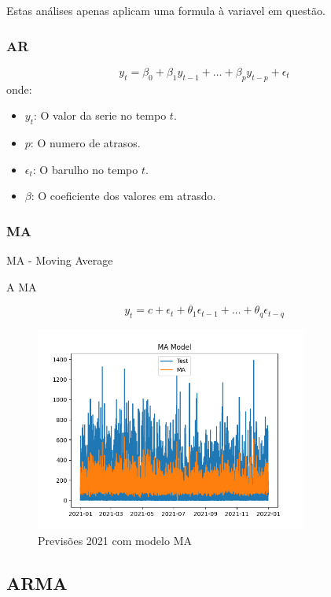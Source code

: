 Estas análises apenas aplicam uma formula à variavel em questão.

\subsubsection{AR}
\begin{equation} \label{eq:AR} 
    y_t = \beta_0 + \beta_1 y_{t-1} + \dots + \beta_p y_{t-p} + \epsilon_t 
\end{equation}
onde:
\begin{itemize}
  \item $y_t$: O valor da serie no tempo $t$.
  \item $p$: O numero de atrasos.
  \item $\epsilon_t$: O barulho no tempo $t$.
  \item $\beta$: O coeficiente dos valores em atrasdo.
\end{itemize}

\subsubsection{MA}
MA - Moving Average

A MA 


\begin{equation} \label{eq:MA} 
    y_t = c + \epsilon_t + \theta_1 \epsilon_{t-1} + \dots + \theta_q \epsilon_{t-q}
\end{equation}

\begin{figure}[H]
    \centering
    \includegraphics[width=0.8\textwidth]{../plots/MA_model.png}
    \caption{Previsões 2021 com modelo MA}
    \label{fig:MA_model}
\end{figure}
  
\subsection{ARMA}

